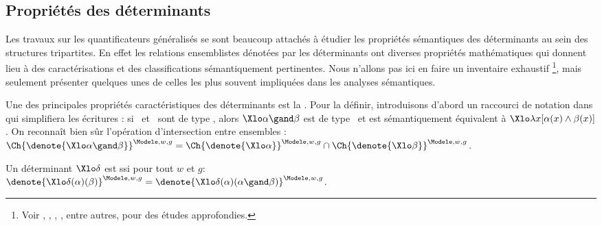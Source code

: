 \fussy

\medskip





\subsection{Propriétés des déterminants}
\label{ss:PtésDet}

Les travaux sur les quantificateurs généralisés se sont beaucoup attachés à étudier les propriétés sémantiques des déterminants au sein des structures tripartites.
En effet les relations ensemblistes dénotées par les déterminants ont diverses propriétés mathématiques qui donnent lieu à des caractérisations et des classifications sémantiquement pertinentes.  Nous n'allons pas ici en faire un inventaire exhaustif%
\footnote{Voir \citet{BarwiseCooper:81}, 
\citet{KeenanStavi:86},
\citet{Westerstahl:89}, 
\citet[chap.~14]{PtMW:90}, entre autres, pour des études approfondies.},
mais seulement présenter quelques unes de celles les plus souvent impliquées dans les analyses sémantiques.


Une des principales propriétés caractéristiques des déterminants est la .  Pour la définir, introduisons d'abord un raccourci de notation dans {\LO} qui simplifiera les écritures : si \vrb\alpha\ et \vrb\beta\ sont de type \et, alors $\Xlo\alpha\gand\beta$ est de type \et\ et est sémantiquement équivalent à $\Xlo\lambda x[\alpha(x)\wedge\beta(x)]$.  On reconnaît bien sûr l'opération d'intersection entre ensembles : \(\Ch{\denote{\Xlo\alpha\gand\beta}}^{\Modele,w,g} = \Ch{\denote{\Xlo\alpha}}^{\Modele,w,g} \cap \Ch{\denote{\Xlo\beta}}^{\Modele,w,g}\).

\begin{defi}[Conservativité]\label{d:conservativité}
Un déterminant $\Xlo\delta$ est  ssi pour tout $w$ et $g$:\\ \(\denote{\Xlo\delta(\alpha)(\beta)}^{\Modele,w,g}=\denote{\Xlo\delta(\alpha)(\alpha\gand\beta)}^{\Modele,w,g}\).
\end{defi}

